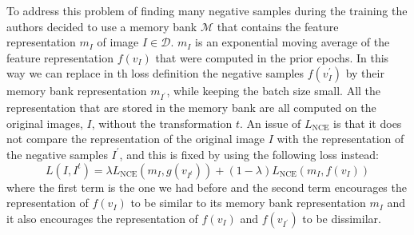 To address this problem of finding many negative samples during the training the authors decided to use a memory bank $\mathcal{M}$ that contains the feature representation $m_I$ of image $I \in \mathcal{D}$. $m_I$ is an exponential moving average of the feature representation $f(v_I)$ that were computed in the prior epochs. In this way we can replace in th loss definition the negative samples $f(v^\prime_I)$ by their memory bank representation $m_{I^\prime}$, while keeping the batch size small. All the representation that are stored in the memory bank are all computed on the original images, $I$, without the transformation $t$. An issue of $L_{\text{NCE}}$ is that it does not compare the representation of the original image $I$ with the representation of the negative samples $I^\prime$, and this is fixed by using the following loss instead:
\[ L(I,I^t) = \lambda L_{\text{NCE}}(m_I, g(v_{I^t})) + (1-\lambda)L_{\text{NCE}}(m_I, f(v_I)) \]
where the first term is the one we had before and the second term encourages the representation of $f(v_I)$ to be similar to its memory bank representation $m_I$ and it also encourages the representation of $f(v_I)$ and $f(v_{I^\prime})$ to be dissimilar. 
